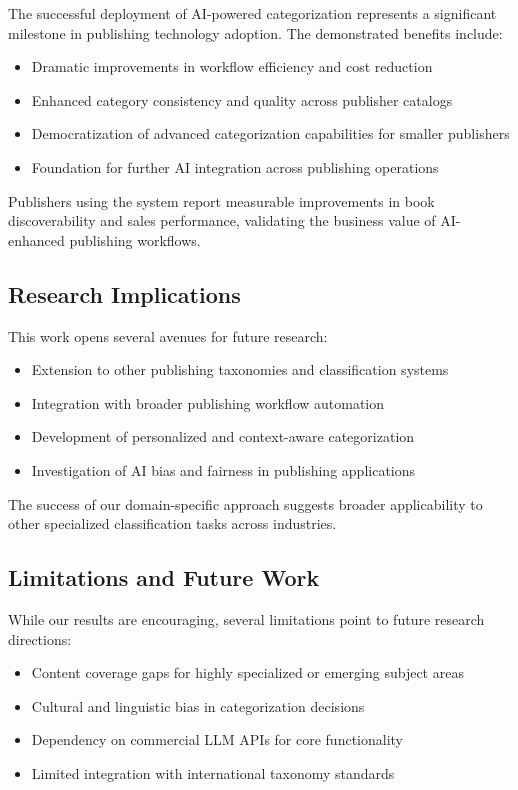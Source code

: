 \documentclass{article}
\begin{document}
The successful deployment of AI-powered categorization represents a significant milestone in publishing technology adoption. The demonstrated benefits include:

\begin{itemize}
\item Dramatic improvements in workflow efficiency and cost reduction
\item Enhanced category consistency and quality across publisher catalogs
\item Democratization of advanced categorization capabilities for smaller publishers
\item Foundation for further AI integration across publishing operations
\end{itemize}

Publishers using the system report measurable improvements in book discoverability and sales performance, validating the business value of AI-enhanced publishing workflows.

\subsection{Research Implications}

This work opens several avenues for future research:

\begin{itemize}
\item Extension to other publishing taxonomies and classification systems
\item Integration with broader publishing workflow automation
\item Development of personalized and context-aware categorization
\item Investigation of AI bias and fairness in publishing applications
\end{itemize}

The success of our domain-specific approach suggests broader applicability to other specialized classification tasks across industries.

\subsection{Limitations and Future Work}

While our results are encouraging, several limitations point to future research directions:

\begin{itemize}
\item Content coverage gaps for highly specialized or emerging subject areas
\item Cultural and linguistic bias in categorization decisions
\item Dependency on commercial LLM APIs for core functionality
\item Limited integration with international taxonomy standards
\end{itemize}
\end{document}
